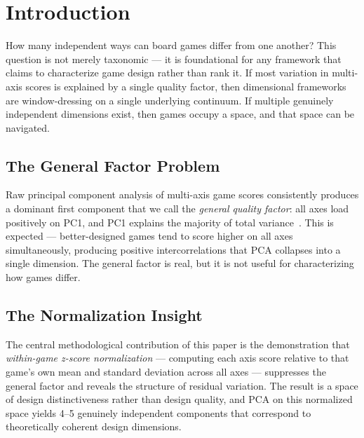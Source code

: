 \section{Introduction}
\label{sec:intro}

How many independent ways can board games differ from one another? This question is
not merely taxonomic --- it is foundational for any framework that claims to characterize
game design rather than rank it. If most variation in multi-axis scores is explained by
a single quality factor, then dimensional frameworks are window-dressing on a single
underlying continuum. If multiple genuinely independent dimensions exist, then games
occupy a space, and that space can be navigated.

\subsection{The General Factor Problem}

Raw principal component analysis of multi-axis game scores consistently produces a dominant
first component that we call the \emph{general quality factor}: all axes load positively
on PC1, and PC1 explains the majority of total variance~\cite{dellaLibera2026corpus}.
This is expected --- better-designed games tend to score higher on all axes simultaneously,
producing positive intercorrelations that PCA collapses into a single dimension. The
general factor is real, but it is not useful for characterizing how games differ.

\subsection{The Normalization Insight}

The central methodological contribution of this paper is the demonstration that
\emph{within-game z-score normalization} --- computing each axis score relative to
that game's own mean and standard deviation across all axes --- suppresses the general
factor and reveals the structure of residual variation. The result is a space of
design distinctiveness rather than design quality, and PCA on this normalized space
yields 4--5 genuinely independent components that correspond to theoretically coherent
design dimensions.
